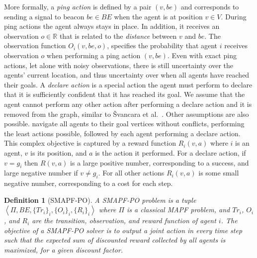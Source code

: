 \documentclass[letterpaper]{article} %
\newcommand{\tuple}[1]{\ensuremath{\left \langle #1 \right \rangle }}
\newcommand{\shortcite}[1]{{\cite{#1}}}
\newtheorem{definition}{Definition}
\begin{document}
More formally, a \emph{ping action} is defined by a pair $(v,be)$ and corresponds to sending a signal to beacon $be\in BE$ when the agent is at position $v\in V$. During ping actions the agent always stays in place.
In addition, it receives an observation $o\in\mathbb{R}$ that is related to the \emph{distance} between $v$ and $be$. The  observation function $O_i(v,be,o)$, specifies the probability that agent $i$ receives observation $o$ when performing a ping action $(v,be)$.
Even with exact ping actions, let alone with noisy observations, there is still uncertainty over the agents' current location, and thus uncertainty over when all agents have reached their goals.
A \emph{declare action} is a special action the agent must perform to declare that it is sufficiently confident that it has reached its goal. We assume that the agent cannot perform any other action after performing a declare action and it is removed from the graph, similar to  {\v{S}}vancara et al.~\shortcite{vsvancara2019online}. Other assumptions are also possible.
navigate all agents to their goal vertices without conflicts, performing the least actions possible, followed by each agent performing a declare action.
This complex objective is captured by a reward function $R_i(v,a)$ where $i$ is an agent, $v$ is its position, and $a$ is the action it performed.
For a declare action, if $v=g_i$ then $R(v,a)$ is a large positive number, corresponding to a success, and large negative number if $v \neq g_i$.  For all other actions $R_i(v,a)$ is some small negative number, corresponding to a cost for each step.
\begin{definition}[SMAPF-PO]
A SMAPF-PO problem is a tuple $\tuple{\Pi,BE,\{Tr_i\}_i, \{O_i\}_i, \{R_i\}_i}$ where $\Pi$ is a classical MAPF problem, and $Tr_i$, $O_i$, and $R_i$ are the transition, observation, and reward function of agent $i$.
The objective of a SMAPF-PO solver is to output a joint action in every time step such that the expected sum of discounted reward collected by all agents is maximized, for a given discount factor.
\end{definition}
\end{document}
